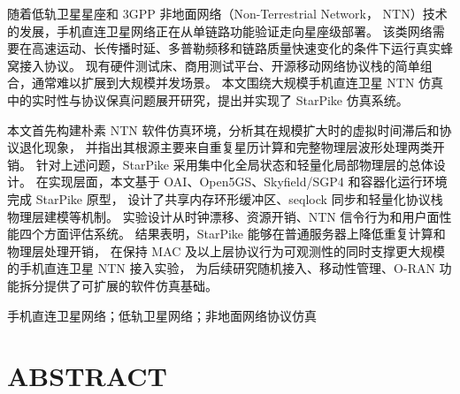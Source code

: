 
\clearpage
\titlespacing{\chapter}{0pt}{0mm}{5mm}



随着低轨卫星星座和 3GPP 非地面网络（Non-Terrestrial Network， NTN）技术的发展，手机直连卫星网络正在从单链路功能验证走向星座级部署。
该类网络需要在高速运动、长传播时延、多普勒频移和链路质量快速变化的条件下运行真实蜂窝接入协议。
现有硬件测试床、商用测试平台、开源移动网络协议栈的简单组合，通常难以扩展到大规模并发场景。
本文围绕大规模手机直连卫星 NTN 仿真中的实时性与协议保真问题展开研究，提出并实现了 StarPike 仿真系统。

本文首先构建朴素 NTN 软件仿真环境，分析其在规模扩大时的虚拟时间滞后和协议退化现象，
并指出其根源主要来自重复星历计算和完整物理层波形处理两类开销。
针对上述问题，StarPike 采用集中化全局状态和轻量化局部物理层的总体设计。
在实现层面，本文基于 OAI、Open5GS、Skyfield/SGP4 和容器化运行环境完成 StarPike 原型，
设计了共享内存环形缓冲区、seqlock 同步和轻量化协议栈物理层建模等机制。
实验设计从时钟漂移、资源开销、NTN 信令行为和用户面性能四个方面评估系统。
结果表明，StarPike 能够在普通服务器上降低重复计算和物理层处理开销，
在保持 MAC 及以上层协议行为可观测性的同时支撑更大规模的手机直连卫星 NTN 接入实验，
为后续研究随机接入、移动性管理、O-RAN 功能拆分提供了可扩展的软件仿真基础。

\vspace{\baselineskip}
 手机直连卫星网络；低轨卫星网络；非地面网络协议仿真


\clearpage
{}

\titlespacing{\chapter}{0pt}{0mm}{5mm}
\chapter*{ABSTRACT}

